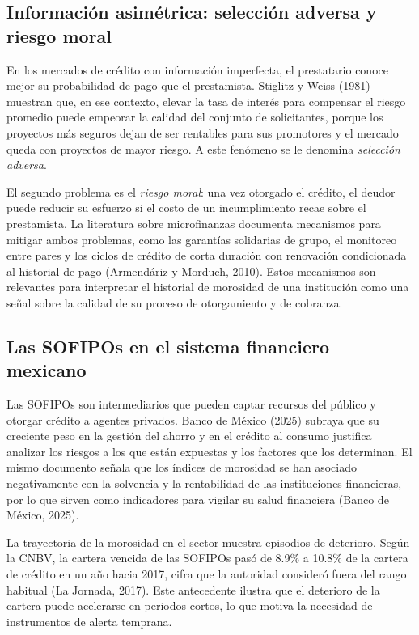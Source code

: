 \subsection{Información asimétrica: selección adversa y riesgo moral}
En los mercados de crédito con información imperfecta, el prestatario conoce mejor su probabilidad de pago que el prestamista. Stiglitz y Weiss (1981) muestran que, en ese contexto, elevar la tasa de interés para compensar el riesgo promedio puede empeorar la calidad del conjunto de solicitantes, porque los proyectos más seguros dejan de ser rentables para sus promotores y el mercado queda con proyectos de mayor riesgo. A este fenómeno se le denomina \textit{selección adversa}.%

El segundo problema es el \textit{riesgo moral}: una vez otorgado el crédito, el deudor puede reducir su esfuerzo si el costo de un incumplimiento recae sobre el prestamista. La literatura sobre microfinanzas documenta mecanismos para mitigar ambos problemas, como las garantías solidarias de grupo, el monitoreo entre pares y los ciclos de crédito de corta duración con renovación condicionada al historial de pago (Armendáriz y Morduch, 2010). Estos mecanismos son relevantes para interpretar el historial de morosidad de una institución como una señal sobre la calidad de su proceso de otorgamiento y de cobranza.

\subsection{Las SOFIPOs en el sistema financiero mexicano}
Las SOFIPOs son intermediarios que pueden captar recursos del público y otorgar crédito a agentes privados. Banco de México (2025) subraya que su creciente peso en la gestión del ahorro y en el crédito al consumo justifica analizar los riesgos a los que están expuestas y los factores que los determinan. El mismo documento señala que los índices de morosidad se han asociado negativamente con la solvencia y la rentabilidad de las instituciones financieras, por lo que sirven como indicadores para vigilar su salud financiera (Banco de México, 2025).

La trayectoria de la morosidad en el sector muestra episodios de deterioro. Según la CNBV, la cartera vencida de las SOFIPOs pasó de 8.9\% a 10.8\% de la cartera de crédito en un año hacia 2017, cifra que la autoridad consideró fuera del rango habitual (La Jornada, 2017). Este antecedente ilustra que el deterioro de la cartera puede acelerarse en periodos cortos, lo que motiva la necesidad de instrumentos de alerta temprana.

